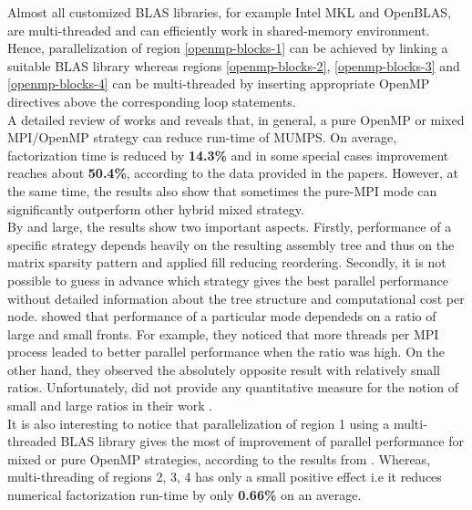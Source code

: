Almost all customized BLAS libraries, for example Intel MKL and OpenBLAS, are multi-threaded and can efficiently work in shared-memory environment. Hence, parallelization of region \ref{openmp-blocks-1} can be achieved by linking a suitable BLAS library whereas regions \ref{openmp-blocks-2}, \ref{openmp-blocks-3} and \ref{openmp-blocks-4} can be multi-threaded by inserting appropriate OpenMP directives above the corresponding loop statements.\\


A detailed review of works \cite{l2013introduction} and \cite{chowdhury2010some} reveals that, in general, a pure OpenMP or mixed MPI/OpenMP strategy can reduce run-time of MUMPS. On average, factorization time is reduced by \textbf{14.3\%} and in some special cases improvement reaches about \textbf{50.4\%}, according to the data provided in the papers. However, at the same time, the results also show that sometimes the pure-MPI mode can significantly outperform other hybrid mixed strategy.\\


By and large, the results show two important aspects. Firstly, performance of a specific strategy depends heavily on the resulting assembly tree and thus on the matrix sparsity pattern and applied fill reducing reordering. Secondly, it is not possible to guess in advance which strategy gives the best parallel performance without detailed information about the tree structure and computational cost per node. \citeauthor{l2013introduction} showed that performance of a particular mode dependeds on a ratio of large and small fronts. For example, they noticed that more threads per MPI process leaded to better parallel performance when the ratio was high. On the other hand, they observed the absolutely opposite result with relatively small ratios. Unfortunately, \citeauthor{l2013introduction} did not provide any quantitative measure for the notion of small and large ratios in their work \cite{l2013introduction}.\\ 


It is also interesting to notice that parallelization of region 1 using a multi-threaded BLAS library gives the most of improvement of parallel performance for mixed or pure OpenMP strategies, according to the results from \cite{l2013introduction}. Whereas,
multi-threading of regions 2, 3, 4 has only a small positive effect i.e it reduces numerical factorization run-time by only \textbf{0.66\%} on an average.\\



